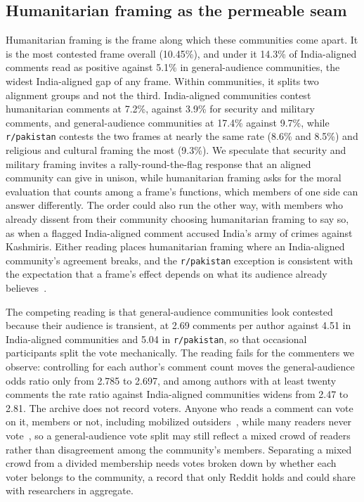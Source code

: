 \subsection{Humanitarian framing as the permeable seam}

Humanitarian framing is the frame along which these communities come apart. It is the most contested frame overall (10.45\%), and under it 14.3\% of India-aligned comments read as positive against 5.1\% in general-audience communities, the widest India-aligned gap of any frame. Within communities, it splits two alignment groups and not the third. India-aligned communities contest humanitarian comments at 7.2\%, against 3.9\% for security and military comments, and general-audience communities at 17.4\% against 9.7\%, while \texttt{r/pakistan} contests the two frames at nearly the same rate (8.6\% and 8.5\%) and religious and cultural framing the most (9.3\%). We speculate that security and military framing invites a rally-round-the-flag response that an aligned community can give in unison, while humanitarian framing asks for the moral evaluation that \citet{entman1993framing} counts among a frame's functions, which members of one side can answer differently. The order could also run the other way, with members who already dissent from their community choosing humanitarian framing to say so, as when a flagged India-aligned comment accused India's army of crimes against Kashmiris. Either reading places humanitarian framing where an India-aligned community's agreement breaks, and the \texttt{r/pakistan} exception is consistent with the expectation that a frame's effect depends on what its audience already believes~\cite{chongdruckman2007framing}.

The competing reading is that general-audience communities look contested because their audience is transient, at 2.69 comments per author against 4.51 in India-aligned communities and 5.04 in \texttt{r/pakistan}, so that occasional participants split the vote mechanically. The reading fails for the commenters we observe: controlling for each author's comment count moves the general-audience odds ratio only from 2.785 to 2.697, and among authors with at least twenty comments the rate ratio against India-aligned communities widens from 2.47 to 2.81. The archive does not record voters. Anyone who reads a comment can vote on it, members or not, including mobilized outsiders~\cite {kumar2018conflict}, while many readers never vote~\cite{gilbert2013underprovision}, so a general-audience vote split may still reflect a mixed crowd of readers rather than disagreement among the community's members. Separating a mixed crowd from a divided membership needs votes broken down by whether each voter belongs to the community, a record that only Reddit holds and could share with researchers in aggregate.


